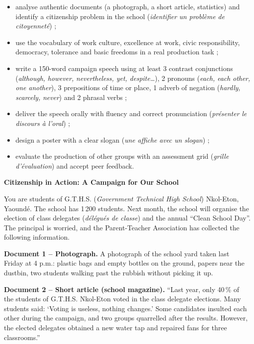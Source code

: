 \documentclass[11pt]{article}
\newcommand{\cle}[1]{{\popxbold\color{popdark}#1}}
\newcounter{popsec}
\newcounter{popsub}
\newcommand{\courssub}[1]{%
  \stepcounter{popsub}%
  \par\vspace{9pt}\noindent{\popxbold\fontsize{11.5}{13}\selectfont\color{popink}{\color{poporange}\thepopsec.\thepopsub}\hspace{6pt}#1}\par\nopagebreak\vspace{4pt}
}
\begin{document}
\begin{itemize}
\item analyse authentic documents (a photograph, a short article, statistics) and identify a citizenship problem in the school (\emph{identifier un problème de citoyenneté}) ;
\item use the vocabulary of \cle{work culture}, \cle{excellence at work}, \cle{civic responsibility}, \cle{democracy}, \cle{tolerance} and \cle{basic freedoms} in a real production task ;
\item write a 150-word campaign speech using at least 3 contrast conjunctions (\emph{although, however, nevertheless, yet, despite\ldots}), 2 pronouns (\emph{each, each other, one another}), 3 prepositions of time or place, 1 adverb of negation (\emph{hardly, scarcely, never}) and 2 phrasal verbs ;
\item deliver the speech orally with fluency and correct pronunciation (\emph{présenter le discours à l'oral}) ;
\item design a poster with a clear slogan (\emph{une affiche avec un slogan}) ;
\item evaluate the production of other groups with an assessment grid (\emph{grille d'évaluation}) and accept peer feedback.
\end{itemize}

\courssub{Situation}

\textbf{Citizenship in Action: A Campaign for Our School}

You are students of G.T.H.S. (\emph{Government Technical High School}) Nkol-Eton, Yaoundé. The school has 1\,200 students. Next month, the school will organise the election of class delegates (\emph{délégués de classe}) and the annual ``Clean School Day''. The principal is worried, and the Parent-Teacher Association has collected the following information.

\textbf{Document 1 -- Photograph.} A photograph of the school yard taken last Friday at 4 p.m.: plastic bags and empty bottles on the ground, papers near the dustbin, two students walking past the rubbish without picking it up.

\textbf{Document 2 -- Short article (school magazine).} ``Last year, only 40\,\% of the students of G.T.H.S. Nkol-Eton voted in the class delegate elections. Many students said: `Voting is useless, nothing changes.' Some candidates insulted each other during the campaign, and two groups quarrelled after the results. However, the elected delegates obtained a new water tap and repaired fans for three classrooms.''
\end{document}
